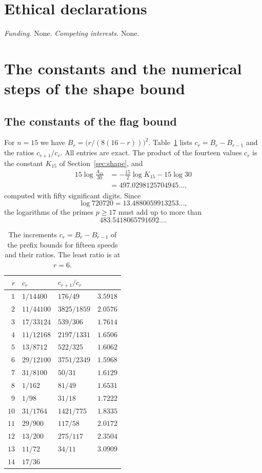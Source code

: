 \documentclass[11pt]{amsart}
\theoremstyle{definition}
\theoremstyle{remark}
\begin{document}
\section*{Ethical declarations}

\emph{Funding.} None. \emph{Competing interests.} None.


\appendix

\section{The constants and the numerical steps of the shape bound}\label{app:shape}

\subsection{The constants of the flag bound}

For $n=15$ we have $B_r=\bigl(r/(8(16-r))\bigr)^2$. Table~\ref{tab:cr} lists
$c_r=B_r-B_{r-1}$ and the ratios $c_{r+1}/c_r$. All entries are exact. The
product of the fourteen values $c_r$ is the constant $K_{15}$ of
Section~\ref{sec:shape}, and
\begin{align*}
 15\log\frac{A_{15}}{30}&=-\frac{15}2\log K_{15}-15\log30\\
 &=497.0298125704945\ldots ,
\end{align*}
computed with fifty significant digits. Since
\[
 \log720720=13.4880059913253\ldots ,
\]
the logarithms of the primes $p\ge17$ must add up to more than
\[
 483.5418065791692\ldots .
\]

\begin{table}[t]
\caption{The increments $c_r=B_r-B_{r-1}$ of the prefix bounds for fifteen
speeds and their ratios. The least ratio is at $r=6$.}
\label{tab:cr}
\centering
\small
\begin{tabular}{@{}rlll@{}}
\toprule
$r$ & $c_r$ & $c_{r+1}/c_r$ & \\
\midrule
$1$ & $1/14400$ & $176/49$ & $3.5918$\\
$2$ & $11/44100$ & $3825/1859$ & $2.0576$\\
$3$ & $17/33124$ & $539/306$ & $1.7614$\\
$4$ & $11/12168$ & $2197/1331$ & $1.6506$\\
$5$ & $13/8712$ & $522/325$ & $1.6062$\\
$6$ & $29/12100$ & $3751/2349$ & $1.5968$\\
$7$ & $31/8100$ & $50/31$ & $1.6129$\\
$8$ & $1/162$ & $81/49$ & $1.6531$\\
$9$ & $1/98$ & $31/18$ & $1.7222$\\
$10$ & $31/1764$ & $1421/775$ & $1.8335$\\
$11$ & $29/900$ & $117/58$ & $2.0172$\\
$12$ & $13/200$ & $275/117$ & $2.3504$\\
$13$ & $11/72$ & $34/11$ & $3.0909$\\
$14$ & $17/36$ &  & \\
\bottomrule
\end{tabular}
\end{table}
\end{document}
